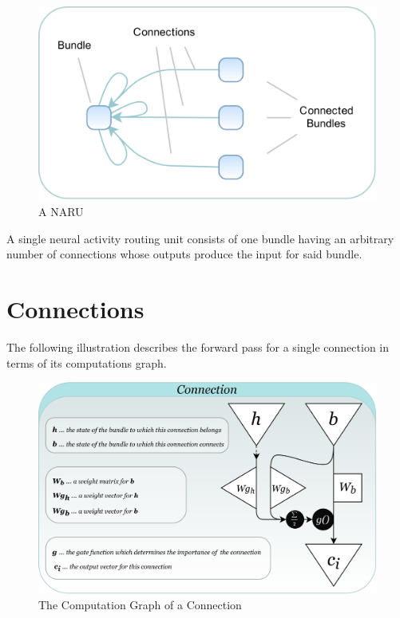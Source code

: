 \begin{figure}[h]
  \centering 
    \includegraphics[width=\textwidth]{PICs/NARU/very-simple-naru.png}
    \caption{A \acf{NARU}}
    \label{very-simple-naru-illustration}
\end{figure}

A single neural activity routing unit consists of one bundle having an arbitrary number of connections whose outputs produce the input for said bundle.


\clearpage


\section{Connections}\label{sec_connection}

The following illustration describes the forward pass for a single connection
in terms of its computations graph. 

 
\begin{figure}[h]
  \centering 
    \includegraphics[width=\textwidth]{PICs/NARU/naru-connection.png}
    \caption{The Computation Graph of a Connection}
    \label{naru-Connection}
\end{figure}

